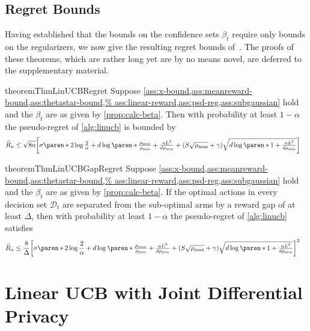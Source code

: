\documentclass{article}
\DeclarePairedDelimiter{\paren}()
\DeclarePairedDelimiter{\brck}{[}{]}
\newcommand{\D}{\mathcal{D}}
\begin{document}
\subsection{Regret Bounds}
\label{sec:regret-bounds}
Having established that the bounds on the confidence sets $\beta_t$ require only bounds on the regularizers, we now give the resulting regret bounds of~. The proofs of these theorems, which are rather long yet are by no means novel, are deferred to the supplementary material.
\begin{restatable}{theorem}{ThmLinUCBRegret}%
  \label{thm:linucb-regret}%
  Suppose \cref{ass:x-bound,ass:meanreward-bound,ass:thetastar-bound,%
    ass:linear-reward,ass:psd-reg,ass:subgaussian} hold and the
  $\beta_t$ are as given by \cref{prop:calc-beta}.  Then with
  probability at least $1-\alpha$ the pseudo-regret of
  \cref{alg:linucb} is bounded by
    \begin{align}
    \label{eq:regret_general_formula}
    \widehat R_n
    &\le \sqrt{8n}\brck[\bigg]{\sigma\paren*{2\log\tfrac{2}{\alpha}
      + d\log\paren*{\tfrac{\rho_{\max}}{\rho_{\min}} + \tfrac{nL^2}{d\rho_{\min}}}}
      + (S\sqrt{\rho_{\max}} + \gamma)\sqrt{d\log\paren*{1 + \tfrac{nL^2}{d\rho_{\min}}}}}
  \end{align}
\end{restatable}

\begin{restatable}{theorem}{ThmLinUCBGapRegret}%
  \label{thm:linucb-gap-regret}
  Suppose \cref{ass:x-bound,ass:meanreward-bound,ass:thetastar-bound,%
    ass:linear-reward,ass:psd-reg,ass:subgaussian} hold and the
  $\beta_t$ are as given by \cref{prop:calc-beta}.  If the optimal
  actions in every decision set $\D_t$ are separated from the
  sub-optimal arms by a reward gap of at least $\Delta$, then with
  probability at least $1-\alpha$ the pseudo-regret of
  \cref{alg:linucb} satisfies
  \begin{align}
  \label{eq:regret_gap_general_formula}
    \widehat R_n
    &\le \frac{8}{\Delta} \brck[\bigg]{\sigma\paren*{2\log\frac{2}{\alpha}
      + d\log\paren*{\tfrac{\rho_{\max}}{\rho_{\min}} + \tfrac{nL^2}{d\rho_{\min}}}}
      + (S\sqrt{\rho_{\max}}+\gamma)\sqrt{d\log\paren*{1+\tfrac{nL^2}{d\rho_{\min}}}}}^2
  \end{align}
\end{restatable}


\section{Linear UCB with Joint Differential Privacy}
\label{sec:alg-dp}
\end{document}
